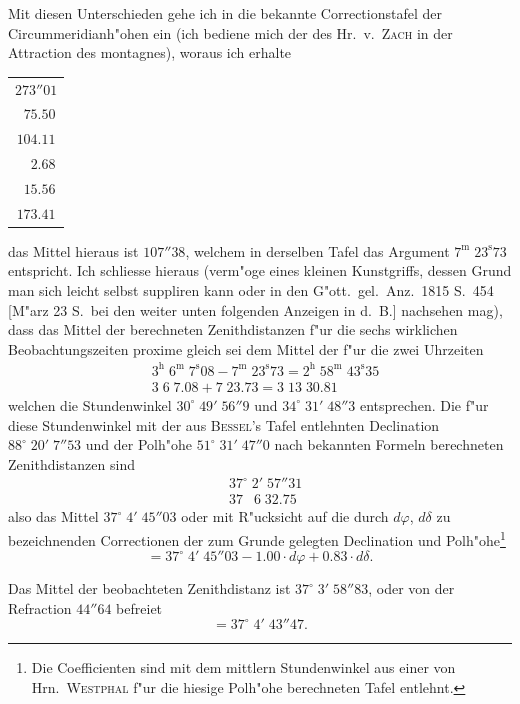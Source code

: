 \documentclass[12pt,a4paper]{article}
\begin{document}
Mit diesen Unterschieden gehe ich in die bekannte Correctionstafel der Circummeridianh"ohen ein
(ich bediene mich der des Hr.~v.~\textsc{Zach} in der Attraction des montagnes), woraus ich erhalte
\begin{center}
\begin{tabular}{c}
$273''01$ \\
$\phantom{0}75.50$ \\
$104.11$ \\
$\phantom{0}\phantom{0}2.68$ \\
$\phantom{0}15.56$ \\
$173.41$ \\
\end{tabular}
\end{center}
das Mittel hieraus ist $107''38$, welchem in derselben Tafel das Argument $7^{\mathrm{m}}\;23^{\mathrm{s}}73$ entspricht.
Ich schliesse hieraus (verm"oge eines kleinen Kunstgriffs, dessen Grund man sich leicht selbst suppliren
kann oder in den G"ott.~gel.~Anz.~1815 S.~454 [M"arz 23 S.~bei den weiter unten folgenden Anzeigen in d.~B.]
nachsehen mag), dass das Mittel der berechneten Zenithdistanzen f"ur die sechs wirklichen Beobachtungszeiten
proxime gleich sei dem Mittel der f"ur die zwei Uhrzeiten
\begin{align*}
&3^{\mathrm{h}}\;6^{\mathrm{m}}\;7^{\mathrm{s}}08 - 7^{\mathrm{m}}\;23^{\mathrm{s}}73 = 2^{\mathrm{h}}\;58^{\mathrm{m}}\;43^{\mathrm{s}}35 \\
&3\;6\;7.08 + 7\;23.73 = 3\;13\;30.81
\end{align*}
welchen die Stundenwinkel $30^{\circ}\;49'\;56''9$ und $34^{\circ}\;31'\;48''3$ entsprechen. Die f"ur diese Stundenwinkel
mit der aus \textsc{Bessel}'s Tafel entlehnten Declination $88^{\circ}\;20'\;7''53$ und der Polh"ohe
$51^{\circ}\;31'\;47''0$ nach bekannten Formeln berechneten Zenithdistanzen sind
\begin{align*}
&37^{\circ}\;2'\;57''31 \\
&37\;\phantom{0}6\;32.75
\end{align*}
also das Mittel $37^{\circ}\;4'\;45''03$ oder mit R"ucksicht auf die durch $d\varphi$, $d\delta$ zu bezeichnenden Correctionen
der zum Grunde gelegten Declination und Polh"ohe{}\footnote{Die Coefficienten sind mit dem mittlern Stundenwinkel aus einer von Hrn.~\textsc{Westphal} f"ur die hiesige Polh"ohe berechneten Tafel entlehnt.}
\[= 37^{\circ}\;4'\;45''03 - 1.00 \cdot d\varphi + 0.83 \cdot d\delta.\]

Das Mittel der beobachteten Zenithdistanz ist $37^{\circ}\;3'\;58''83$, oder von der Refraction $44''64$ befreiet
\[= 37^{\circ}\;4'\;43''47.\]
\end{document}
